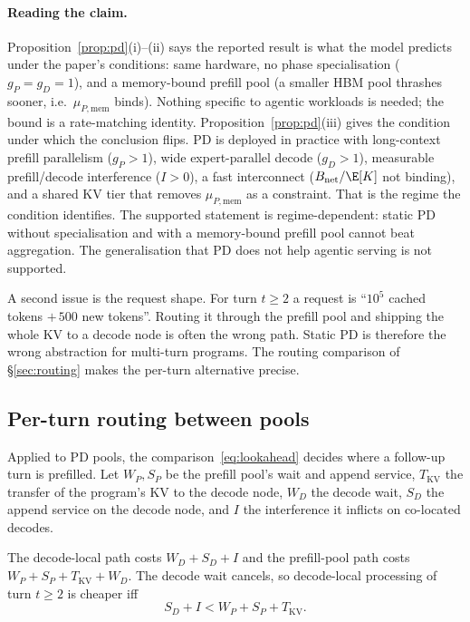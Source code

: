 \paragraph{Reading the claim.} Proposition~\ref{prop:pd}(i)--(ii) says the
reported result is what the model predicts under the paper's conditions:
same hardware, no phase specialisation ($g_P=g_D=1$), and a memory-bound
prefill pool (a smaller HBM pool thrashes sooner, i.e.\
$\mu_{P,\mathrm{mem}}$ binds). Nothing specific to agentic workloads is
needed; the bound is a rate-matching identity. Proposition~\ref{prop:pd}(iii)
gives the condition under which the conclusion flips. PD is deployed in
practice \citep{vllm-agentx,mooncake-vllm} with long-context prefill
parallelism ($g_P>1$), wide expert-parallel decode ($g_D>1$), measurable
prefill/decode interference ($I>0$), a fast interconnect
($B_{\mathrm{net}}/\E[K]$ not binding), and a shared KV tier that removes
$\mu_{P,\mathrm{mem}}$ as a constraint. That is the regime the condition
identifies. The supported statement is regime-dependent: static PD
without specialisation and with a memory-bound prefill pool cannot beat
aggregation. The generalisation that PD does not help agentic serving is
not supported.

A second issue is the request shape. For turn $t\ge2$ a request is
``$10^5$ cached tokens $+\,500$ new tokens''. Routing it through the
prefill pool and shipping the whole KV to a decode node is often the
wrong path. Static PD is therefore the wrong abstraction for multi-turn
programs. The routing comparison of \S\ref{sec:routing} makes the
per-turn alternative precise.

\subsection{Per-turn routing between pools}\label{sec:pd-append}

Applied to PD pools, the comparison~\eqref{eq:lookahead} decides where a follow-up turn
is prefilled. Let $W_P,S_P$ be the prefill pool's wait and append service,
$T_{\mathrm{KV}}$ the transfer of the program's KV to the decode node,
$W_D$ the decode wait, $S_D$ the append service on the decode node, and
$I$ the interference it inflicts on co-located decodes.

The decode-local path costs $W_D+S_D+I$ and the prefill-pool path costs
$W_P+S_P+T_{\mathrm{KV}}+W_D$. The decode wait cancels, so decode-local
processing of turn $t\ge2$ is cheaper iff
\begin{equation}\label{eq:append}
  S_D+I < W_P+S_P+T_{\mathrm{KV}} .
\end{equation}



